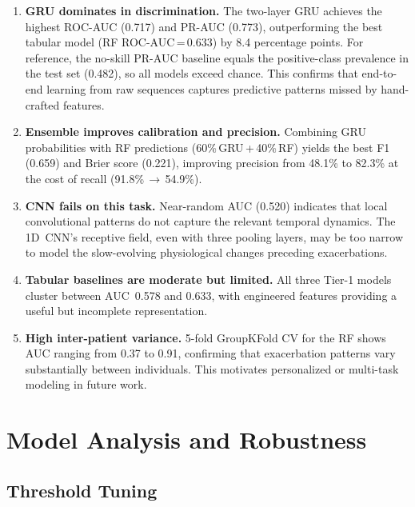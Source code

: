 \documentclass[11pt,a4paper]{article}
\begin{document}
\begin{enumerate}[nosep]
  \item \textbf{GRU dominates in discrimination.}  The two-layer GRU achieves
        the highest ROC-AUC (0.717) and PR-AUC (0.773), outperforming the best
        tabular model (RF ROC-AUC\,=\,0.633) by 8.4 percentage points.  For
        reference, the no-skill PR-AUC baseline equals the positive-class
        prevalence in the test set (0.482), so all models exceed chance.  This
        confirms that end-to-end learning from raw sequences captures
        predictive patterns missed by hand-crafted features.

  \item \textbf{Ensemble improves calibration and precision.}  Combining GRU
        probabilities with RF predictions (60\%\,GRU\,+\,40\%\,RF) yields the
        best F1 (0.659) and Brier score (0.221), improving precision from
        48.1\% to 82.3\% at the cost of recall (91.8\%\,$\to$\,54.9\%).

  \item \textbf{CNN fails on this task.}  Near-random AUC (0.520) indicates
        that local convolutional patterns do not capture the relevant temporal
        dynamics.  The 1D~CNN's receptive field, even with three pooling
        layers, may be too narrow to model the slow-evolving physiological
        changes preceding exacerbations.

  \item \textbf{Tabular baselines are moderate but limited.}  All three
        Tier-1 models cluster between AUC~0.578 and 0.633, with engineered
        features providing a useful but incomplete representation.

  \item \textbf{High inter-patient variance.}  5-fold GroupKFold CV for the RF
        shows AUC ranging from 0.37 to 0.91, confirming that exacerbation
        patterns vary substantially between individuals.  This motivates
        personalized or multi-task modeling in future work.
\end{enumerate}

\section{Model Analysis and Robustness}\label{sec:analysis}

\subsection{Threshold Tuning}\label{sec:threshold}
\end{document}
